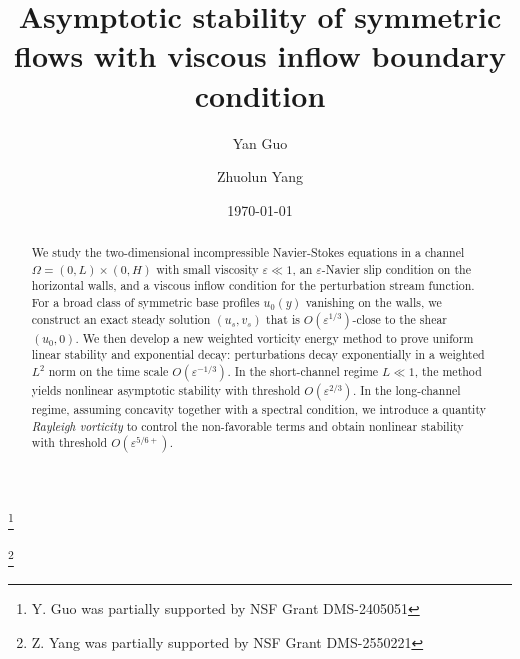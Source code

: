 \documentclass[reqno, 11pt]{amsart}
\theoremstyle{plain}
\theoremstyle{definition}
\theoremstyle{remark}
\numberwithin{equation}{section}
\begin{document}
\title[Stability of symmetric flows]{Asymptotic stability of symmetric flows with viscous inflow boundary condition}
%
\author[Y. Guo]{Yan Guo}

\author[Z. Yang]{Zhuolun Yang}

\address[Y. Guo]{Division of Applied Mathematics, Brown University, 182 George Street, Providence, RI 02912, USA}

\address[Z. Yang]{Department of Mathematics, The Ohio State University, 231 West 18th Avenue, Columbus, OH 43210, USA}

\thanks{Y. Guo was partially supported by NSF Grant DMS-2405051}

\thanks{Z. Yang was partially supported by NSF Grant DMS-2550221}



\date{\today}
\begin{abstract}
We study the two-dimensional incompressible Navier-Stokes equations in a channel $\Omega=(0,L)\times(0,H)$ with small viscosity $\varepsilon\ll1$, an $\varepsilon$-Navier slip condition on the horizontal walls, and a viscous inflow condition for the perturbation stream function. For a broad class of symmetric base profiles $u_0(y)$ vanishing on the walls, we construct an exact steady solution $(u_s,v_s)$ that is $O(\varepsilon^{1/3})$-close to the shear $(u_0,0)$. We then develop a new weighted vorticity energy method to prove uniform linear stability and exponential decay: perturbations decay exponentially in a weighted $L^2$ norm on the time scale $O(\varepsilon^{-1/3})$. In the short-channel regime $L\ll1$, the method yields nonlinear asymptotic stability with threshold $O(\varepsilon^{2/3})$. In the long-channel regime, assuming concavity together with a spectral condition, we introduce a quantity \textit{Rayleigh vorticity} to control the non-favorable terms and obtain nonlinear stability with threshold
$O(\varepsilon^{5/6+})$.
\end{abstract}

\maketitle
\tableofcontents


\end{document}
